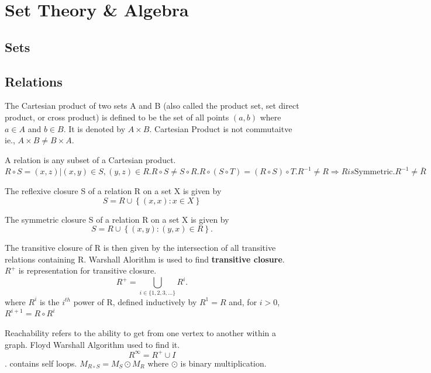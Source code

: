 \documentclass[a4paper,oneside]{book}
\begin{document}
\part{Set Theory \& Algebra}
\chapter{Sets}
\chapter{Relations}
\begin{definition}
The Cartesian product of two sets A and B (also called the product set, set direct product, or cross product) is defined to be the set of all points $(a,b)$ where $a \in A$ and $b \in B$. It is denoted by $A \times B$. Cartesian Product is not commutaitve ie., $A \times B \neq B \times A$.
\end{definition}
\begin{definition}[Relation]
A relation is any subset of a Cartesian product. 
$R \circ S = {(x,z) | (x,y) \in S, (y,z) \in R} . R \circ S \neq S \circ R. R \circ (S \circ T) = (R \circ S) \circ T. R^{-1} \neq R \Rightarrow R is \text{Symmetric}. R^{-1} \neq \bar{R}$
\end{definition}
\begin{definition}
The reflexive closure S of a relation R on a set X is given by
$$ S = R \cup \left\{ (x, x) : x \in X \right\} $$
\end{definition}
\begin{definition}
The symmetric closure S of a relation R on a set X is given by
$$ S = R \cup \left\{ (x, y) : (y, x) \in R \right\}.  $$
\end{definition}
\begin{definition}
The transitive closure of R is then given by the intersection of all transitive relations containing R. Warshall Alorithm is used to find \textbf{transitive closure}.\\
$R^{+}$ is representation for transitive closure.
$$R^{+}=\bigcup_{i\in \{1,2,3,\ldots\}} R^i.$$
where $R^i$ is the $i^{th}$ power of R, defined inductively by
$R^1 = R$ and, for $i>0$,
$R^{i+1} = R \circ R^i$
\end{definition}
\begin{definition}
Reachability refers to the ability to get from one vertex to another within a graph. Floyd Warshall Algorithm used to find it.
$$ R^{\infty} = R^{+} \cup I $$. contains self loops. $ M_{R \circ S} = M_{S} \odot M_{R}$ where $\odot$ is binary multiplication.
\end{definition}
\end{document}
